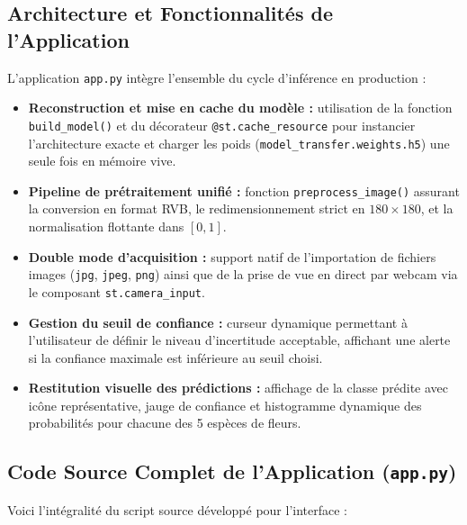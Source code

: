\documentclass[12pt,a4paper]{article}
\begin{document}
\subsection{Architecture et Fonctionnalités de l'Application}
L'application \texttt{app.py} intègre l'ensemble du cycle d'inférence en production :
\begin{itemize}
    \item \textbf{Reconstruction et mise en cache du modèle :} utilisation de la fonction \texttt{build\_model()} et du décorateur \texttt{@st.cache\_resource} pour instancier l'architecture exacte et charger les poids (\texttt{model\_transfer.weights.h5}) une seule fois en mémoire vive.
    \item \textbf{Pipeline de prétraitement unifié :} fonction \texttt{preprocess\_image()} assurant la conversion en format RVB, le redimensionnement strict en $180 \times 180$, et la normalisation flottante dans $[0, 1]$.
    \item \textbf{Double mode d'acquisition :} support natif de l'importation de fichiers images (\texttt{jpg}, \texttt{jpeg}, \texttt{png}) ainsi que de la prise de vue en direct par webcam via le composant \texttt{st.camera\_input}.
    \item \textbf{Gestion du seuil de confiance :} curseur dynamique permettant à l'utilisateur de définir le niveau d'incertitude acceptable, affichant une alerte si la confiance maximale est inférieure au seuil choisi.
    \item \textbf{Restitution visuelle des prédictions :} affichage de la classe prédite avec icône représentative, jauge de confiance et histogramme dynamique des probabilités pour chacune des 5 espèces de fleurs.
\end{itemize}

\subsection{Code Source Complet de l'Application (\texttt{app.py})}
Voici l'intégralité du script source développé pour l'interface :
\end{document}
